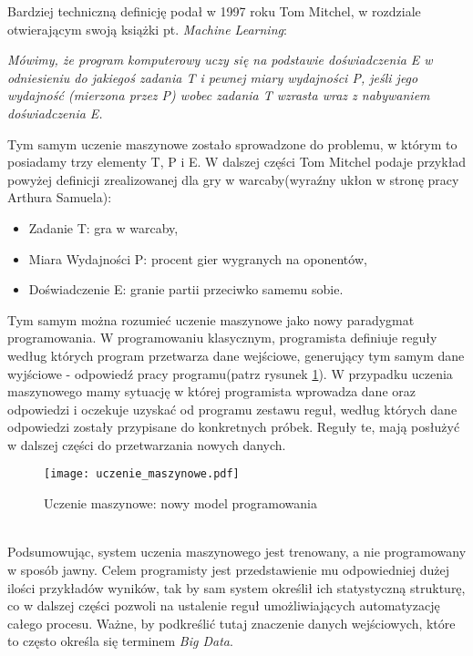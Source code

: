 Bardziej techniczną definicję podał w 1997 roku Tom Mitchel, w rozdziale otwierającym swoją książki pt. \textit{Machine Learning}:
\begin{center}
	\textit{Mówimy, że program komputerowy uczy się na podstawie doświadczenia E w 	odniesieniu do jakiegoś zadania T i pewnej miary wydajności P, jeśli jego wydajność (mierzona przez P) wobec zadania T wzrasta wraz z nabywaniem doświadczenia E.}\cite{mitchell}
\end{center}
Tym samym uczenie maszynowe zostało sprowadzone do problemu, w którym to posiadamy trzy elementy T, P i E. W dalszej części Tom Mitchel podaje przykład powyżej definicji zrealizowanej dla gry w warcaby(wyraźny ukłon w stronę pracy Arthura Samuela\cite{samuel}):
\begin{itemize}
	\item Zadanie T: gra w warcaby,
	\item Miara Wydajności P: procent gier wygranych na oponentów,
	\item Doświadczenie E: granie partii przeciwko samemu sobie.\\
\end{itemize}

Tym samym można rozumieć uczenie maszynowe jako nowy paradygmat programowania. W programowaniu klasycznym, programista definiuje reguły według których program przetwarza dane wejściowe, generujący tym samym dane wyjściowe - odpowiedź pracy programu(patrz rysunek \ref{fig:uczenie_maszynowe}). W przypadku uczenia maszynowego mamy sytuację w której programista wprowadza dane oraz odpowiedzi i oczekuje uzyskać od programu zestawu reguł, według których dane odpowiedzi zostały przypisane do konkretnych próbek. Reguły te, mają posłużyć w dalszej części do przetwarzania nowych danych.
\begin{figure}[h!]
	\texttt{[image: uczenie\_maszynowe.pdf]}
	\centering
	\caption{Uczenie maszynowe: nowy model programowania}
	\label{fig:uczenie_maszynowe}
\end{figure}
\\

Podsumowując, system uczenia maszynowego jest trenowany, a nie programowany w sposób jawny. Celem programisty jest przedstawienie mu odpowiedniej dużej ilości przykładów wyników, tak by sam system określił ich statystyczną strukturę, co w dalszej części pozwoli na ustalenie reguł umożliwiających automatyzację całego procesu. Ważne, by podkreślić tutaj znaczenie danych wejściowych, które to często określa się terminem \textit{Big Data}\cite{big_data}.

